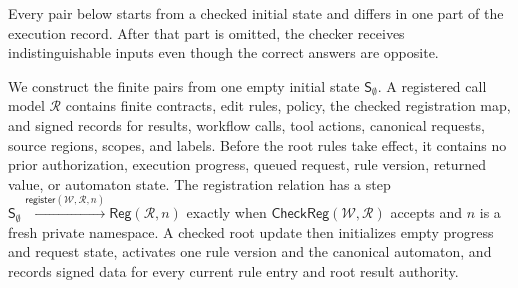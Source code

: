 Every pair below starts from a checked initial state and differs in one part of the execution record.
After that part is omitted, the checker receives indistinguishable inputs even though the correct answers are opposite.

We construct the finite pairs from one empty initial state \(\mathsf S_\emptyset\).
A registered call model \(\mathcal R\) contains finite contracts, edit rules, policy, the checked registration map, and signed records for results, workflow calls, tool actions, canonical requests, source regions, scopes, and labels.
Before the root rules take effect, it contains no prior authorization, execution progress, queued request, rule version, returned value, or automaton state.
The registration relation has a step \(\mathsf S_\emptyset\xrightarrow{\mathsf{register}(\mathcal W,\mathcal R,n)}\mathsf{Reg}(\mathcal R,n)\) exactly when \(\mathsf{CheckReg}(\mathcal W,\mathcal R)\) accepts and \(n\) is a fresh private namespace.
A checked root update then initializes empty progress and request state, activates one rule version and the canonical automaton, and records signed data for every current rule entry and root result authority.

